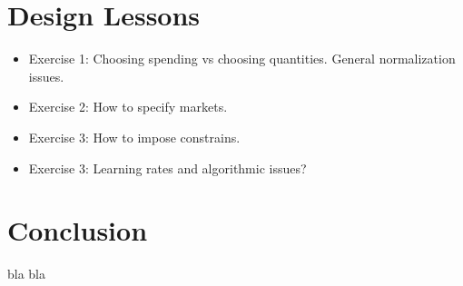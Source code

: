 \documentclass[11pt,english]{article}
\begin{document}
\section{Design Lessons}
\begin{itemize}
	\item Exercise 1: Choosing spending vs choosing quantities. General normalization issues.
	\item Exercise 2: How to specify markets.
	\item Exercise 3: How to impose constrains.
	\item Exercise 3: Learning rates and algorithmic issues?
\end{itemize}

\section{Conclusion}

bla bla




\end{document}
